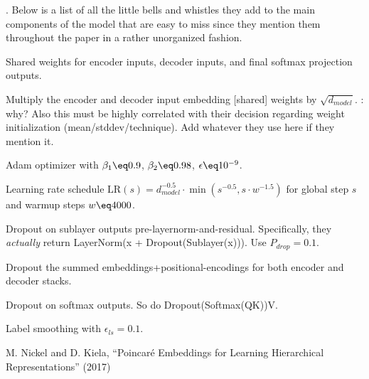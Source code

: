 \documentclass[11pt]{article}
\begin{document}
. Below is a list of all the little bells and whistles they add to the main components of the model that are easy to miss since they mention them throughout the paper in a rather unorganized fashion.
\begin{compactitem}
	\item Shared weights for encoder inputs, decoder inputs, and final softmax projection outputs. 
	\item Multiply the encoder and decoder input embedding [shared] weights by $\sqrt{d_{model}}$. : why? Also this must be highly correlated with their decision regarding weight initialization (mean/stddev/technique). Add whatever they use here if they mention it.
	
	\item Adam optimizer with $\beta_1 \eq 0.9$, $\beta_2 \eq 0.98$, $\epsilon \eq 10^{-9}$.
	
	\item Learning rate schedule $\text{LR}(s) = d^{-0.5}_{model} \cdot \min \left(  s^{-0.5}, s \cdot w^{-1.5}  \right)  $ for global step $s$ and warmup steps $w \eq 4000$. 
	
	\item Dropout on sublayer outputs pre-layernorm-and-residual. Specifically, they \textit{actually} return LayerNorm(x + Dropout(Sublayer(x))). Use $P_{drop} = 0.1$. 
	
	\item Dropout the summed embeddings+positional-encodings for both encoder and decoder stacks.
	
	\item Dropout on softmax outputs. So do Dropout(Softmax(QK))V. 
	
	\item Label smoothing with $\epsilon_{ls} = 0.1$. 
\end{compactitem}










\vspace{-1em}
{\footnotesize M. Nickel and D. Kiela, ``Poincar\'{e} Embeddings for Learning Hierarchical Representations'' (2017)}
\end{document}
